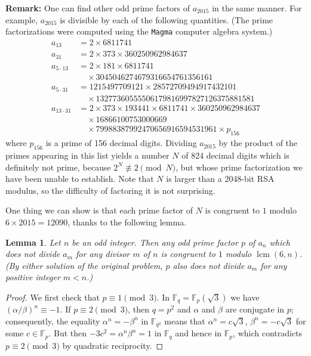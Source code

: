\documentclass[amssymb,twocolumn,pra,10pt,aps]{revtex4-1}
\newtheorem*{lemma*}{Lemma}
\newcommand{\FF}{\mathbb{F}}
\DeclareMathOperator{\lcm}{lcm}
\begin{document}
\begin{itemize}
\noindent
\textbf{Remark:} One can find other odd prime factors of $a_{2015}$ in the same manner. For example, $a_{2015}$ is divisible by each of the following quantities. (The prime factorizations were computed using
the \texttt{Magma} computer algebra system.)
\begin{align*}
a_{13} &= 2 \times 6811741 \\
a_{31} &= 2 \times 373 \times 360250962984637 \\
a_{5 \cdot 13} &= 2 \times 181 \times 6811741 \\
&\quad \times 3045046274679316654761356161 \\
a_{5 \cdot 31} &= 1215497709121 \times 28572709494917432101 \\
&\quad \times
13277360555506179816997827126375881581 \\
a_{13 \cdot 31} &= 2 \times 373 \times 193441 \times 6811741 \times 360250962984637 \\
&\quad \times 16866100753000669 \\
&\quad \times 79988387992470656916594531961 \times p_{156}
\end{align*}
where $p_{156}$ is a prime of 156 decimal digits. Dividing $a_{2015}$ by the product of the primes appearing in this list yields a number $N$ of 824 decimal digits which is definitely not prime, because $2^N \not\equiv 2 \pmod{N}$, but whose prime factorization we have been unable to establish. Note that $N$ is larger than a 2048-bit RSA modulus, so the difficulty of factoring it is not surprising.

One thing we can show is that each prime factor of $N$ is %
congruent to $1$ modulo 
$6 \times 2015 = 12090$, thanks to the following lemma.

\begin{lemma*}
Let $n$ be an odd integer. Then any odd prime factor $p$ of $a_n$ which does not divide $a_m$ for any divisor $m$ of $n$ is congruent to $1$ modulo $\lcm(6,n)$. (By either solution of the original problem, $p$ also does not divide $a_m$ for any positive integer $m<n$.)
\end{lemma*}
\begin{proof}
We first check that $p \equiv 1 \pmod{3}$.
In $\FF_q = \FF_p(\sqrt{3})$ we have $(\alpha/\beta)^n \equiv -1$. If $p \equiv 2 \pmod{3}$,
then $q = p^2$ and $\alpha$ and $\beta$ are conjugate in $p$; consequently, the equality
$\alpha^n = -\beta^n$ in $\FF_{q^2}$ means that $\alpha^n = c \sqrt{3}$, $\beta^n = - c \sqrt{3}$ for some $c \in \FF_p$. But then $-3c^2 = \alpha^n \beta^n = 1$ in $\FF_q$ and hence in $\FF_p$, which contradicts $p \equiv 2 \pmod{3}$ by quadratic reciprocity.


\end{proof}
\end{itemize}
\end{document}
